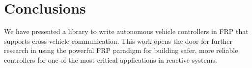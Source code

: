 \section{Conclusions}

We have presented a library to write autonomous vehicle controllers in FRP that supports cross-vehicle communication.
This work opens the door for further research in using the powerful FRP paradigm for building safer, more reliable controllers for one of the most critical applications in reactive systems.



